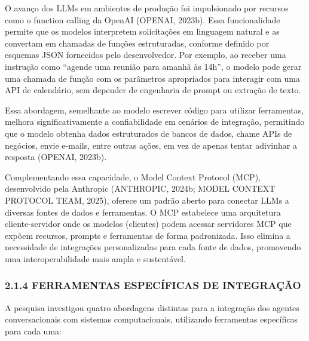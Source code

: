 \documentclass[
]{article}
\begin{document}
O avanço dos LLMs em ambientes de produção foi impulsionado por recursos
como o function calling da OpenAI (OPENAI, 2023b). Essa funcionalidade
permite que os modelos interpretem solicitações em linguagem natural e
as convertam em chamadas de funções estruturadas, conforme definido por
esquemas JSON fornecidos pelo desenvolvedor. Por exemplo, ao receber uma
instrução como ``agende uma reunião para amanhã às 14h'', o modelo pode
gerar uma chamada de função com os parâmetros apropriados para interagir
com uma API de calendário, sem depender de engenharia de prompt ou
extração de texto.

Essa abordagem, semelhante ao modelo escrever código para utilizar
ferramentas, melhora significativamente a confiabilidade em cenários de
integração, permitindo que o modelo obtenha dados estruturados de bancos
de dados, chame APIs de negócios, envie e-mails, entre outras ações, em
vez de apenas tentar adivinhar a resposta (OPENAI, 2023b).

Complementando essa capacidade, o Model Context Protocol (MCP),
desenvolvido pela Anthropic (ANTHROPIC, 2024b; MODEL CONTEXT PROTOCOL
TEAM, 2025), oferece um padrão aberto para conectar LLMs a diversas
fontes de dados e ferramentas. O MCP estabelece uma arquitetura
cliente-servidor onde os modelos (clientes) podem acessar servidores MCP
que expõem recursos, prompts e ferramentas de forma padronizada. Isso
elimina a necessidade de integrações personalizadas para cada fonte de
dados, promovendo uma interoperabilidade mais ampla e sustentável.

\subsubsection{2.1.4 FERRAMENTAS ESPECÍFICAS DE
INTEGRAÇÃO}\label{ferramentas-especuxedficas-de-integrauxe7uxe3o}

A pesquisa investigou quatro abordagens distintas para a integração dos
agentes conversacionais com sistemas computacionais, utilizando
ferramentas específicas para cada uma:
\end{document}
